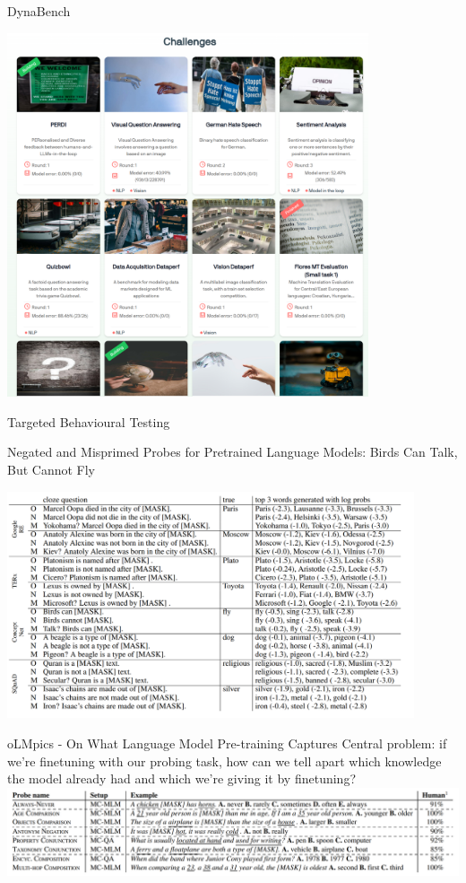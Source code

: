 \begin{vbframe}{DynaBench}

	\includegraphics[width=0.8\textwidth]{evaluation_figures/dynabench_overview.png}

\end{vbframe}

\begin{vbframe}{Targeted Behavioural Testing}

\end{vbframe}

\begin{vbframe}{Negated and Misprimed Probes for Pretrained Language Models: Birds Can Talk, But Cannot Fly	}

	\includegraphics[width=0.9\textwidth]{evaluation_figures/birds.png}
\end{vbframe}

\begin{vbframe}{oLMpics - On What Language Model Pre-training Captures}
	\vfill
	Central problem: if we're finetuning with our probing task, how can we tell apart which knowledge the model already had and which we're giving it by finetuning?
	\vfill
	\includegraphics[width=\textwidth]{evaluation_figures/olmpics.png}
	\vfill
\end{vbframe}

